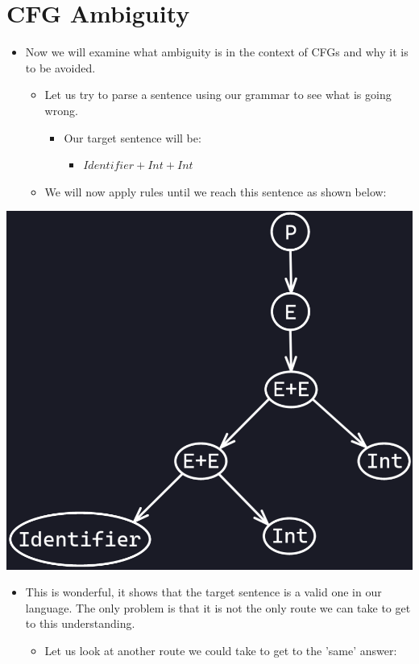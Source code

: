 \documentclass{article}
\begin{document}
\section{CFG Ambiguity}
\begin{itemize}
    \item Now we will examine what ambiguity is in the context of CFGs and why it is to be avoided.
    \begin{itemize}
        \item Let us try to parse a sentence using our grammar to see what is going wrong.
        \begin{itemize}
            \item Our target sentence will be: 
            \begin{itemize}
                \item $Identifier + Int + Int$
            \end{itemize}
        \end{itemize}
        \item We will now apply rules until we reach this sentence as shown below:
    \end{itemize}
\end{itemize}
\begin{center}
    \includegraphics[scale=0.35]{image1.png}
\end{center}
\begin{itemize}
    \item This is wonderful, it shows that the target sentence is a valid one in our language. The only problem is that it is not the only route we can take to get to this understanding.
    \begin{itemize}
        \item Let us look at another route we could take to get to the 'same' answer:
    \end{itemize}
\end{itemize}
\end{document}
